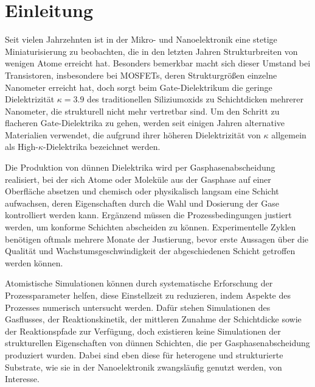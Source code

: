 \cleardoublepage
\chapter{Einleitung}
\label{intro}

Seit vielen Jahrzehnten ist in der Mikro- und Nanoelektronik eine stetige Miniaturisierung zu beobachten, die in den letzten Jahren Strukturbreiten von wenigen Atome erreicht hat.
Besonders bemerkbar macht sich dieser Umstand bei Transistoren, insbesondere bei MOSFETs, deren Strukturgrößen einzelne Nanometer erreicht hat, doch sorgt beim Gate-Dielektrikum die geringe Dielektrizität $\kappa = \num{3.9}$ des traditionellen Siliziumoxids zu Schichtdicken mehrerer Nanometer, die strukturell nicht mehr vertretbar sind.
Um den Schritt zu flacheren Gate-Dielektrika zu gehen, werden seit einigen Jahren alternative Materialien verwendet, die aufgrund ihrer höheren Dielektrizität von $\kappa$ allgemein als High-$\kappa$-Dielektrika bezeichnet werden.


Die Produktion von dünnen Dielektrika wird per Gasphasenabscheidung realisiert, bei der sich Atome oder Moleküle aus der Gasphase auf einer Oberfläche absetzen und chemisch oder physikalisch langsam eine Schicht aufwachsen, deren Eigenschaften durch die Wahl und Dosierung der Gase kontrolliert werden kann.
Ergänzend müssen die Prozessbedingungen justiert werden, um konforme Schichten abscheiden zu können.
Experimentelle Zyklen benötigen oftmals mehrere Monate der Justierung, bevor erste Aussagen über die Qualität und Wachstumsgeschwindigkeit der abgeschiedenen Schicht getroffen werden können.


Atomistische Simulationen können durch systematische Erforschung der Prozessparameter helfen, diese Einstellzeit zu reduzieren, indem Aspekte des Prozesses numerisch untersucht werden.
Dafür stehen Simulationen des Gasflusses, der Reaktionskinetik, der mittleren Zunahme der Schichtdicke sowie der Reaktionspfade zur Verfügung, doch existieren keine Simulationen der strukturellen Eigenschaften von dünnen Schichten, die per Gasphasenabscheidung produziert wurden.
Dabei sind eben diese für heterogene und strukturierte Substrate, wie sie in der Nanoelektronik zwangsläufig genutzt werden, von Interesse.


